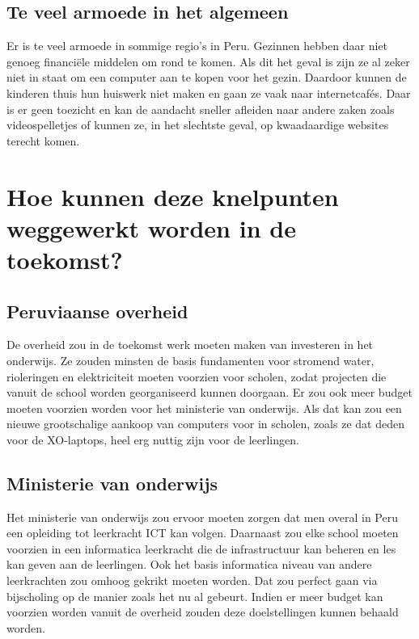 \subsection{Te veel armoede in het algemeen}
Er is te veel armoede in sommige regio's in Peru. Gezinnen hebben daar niet genoeg financiële middelen om rond te komen. Als dit het geval is zijn ze al zeker niet in staat om een computer aan te kopen voor het gezin. Daardoor kunnen de kinderen thuis hun huiswerk niet maken en gaan ze vaak naar internetcafés. Daar is er geen toezicht en kan de aandacht sneller afleiden naar andere zaken zoals videospelletjes of kunnen ze, in het slechtste geval, op kwaadaardige websites terecht komen.

\section{Hoe kunnen deze knelpunten weggewerkt worden in de toekomst?}

\subsection{Peruviaanse overheid}
De overheid zou in de toekomst werk moeten maken van investeren in het onderwijs. Ze zouden minsten de basis fundamenten voor stromend water, rioleringen en elektriciteit moeten voorzien voor scholen, zodat projecten die vanuit de school worden georganiseerd kunnen doorgaan. Er zou ook meer budget moeten voorzien worden voor het ministerie van onderwijs. Als dat kan zou een nieuwe grootschalige aankoop van computers voor in scholen, zoals ze dat deden voor de XO-laptops, heel erg nuttig zijn voor de leerlingen. 

\subsection{Ministerie van onderwijs}
Het ministerie van onderwijs zou ervoor moeten zorgen dat men overal in Peru een opleiding tot leerkracht ICT kan volgen. Daarnaast zou elke school moeten voorzien in een informatica leerkracht die de infrastructuur kan beheren en les kan geven aan de leerlingen. Ook het basis informatica niveau van andere leerkrachten zou omhoog gekrikt moeten worden. Dat zou perfect gaan via bijscholing op de manier zoals het nu al gebeurt. Indien er meer budget kan voorzien worden vanuit de overheid zouden deze doelstellingen kunnen behaald worden.

